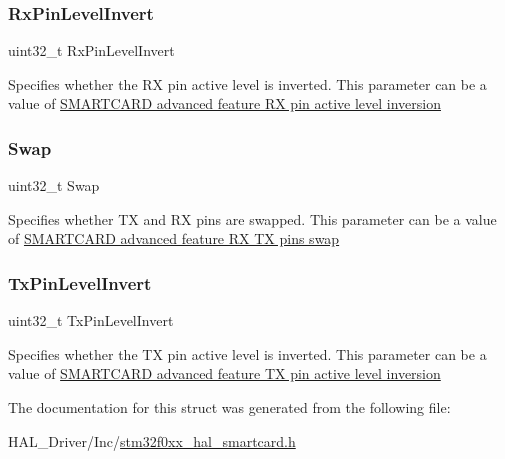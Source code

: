 \subsubsection{\texorpdfstring{Rx\+Pin\+Level\+Invert}{RxPinLevelInvert}}
{\footnotesize\ttfamily uint32\+\_\+t Rx\+Pin\+Level\+Invert}

Specifies whether the RX pin active level is inverted. This parameter can be a value of \hyperlink{group___s_m_a_r_t_c_a_r_d___rx___inv}{S\+M\+A\+R\+T\+C\+A\+RD advanced feature RX pin active level inversion} \mbox{\label{struct_s_m_a_r_t_c_a_r_d___adv_feature_init_type_def_ac584fd738a8eca4af2f92cd10d593ab0}} 
\subsubsection{\texorpdfstring{Swap}{Swap}}
{\footnotesize\ttfamily uint32\+\_\+t Swap}

Specifies whether TX and RX pins are swapped. This parameter can be a value of \hyperlink{group___s_m_a_r_t_c_a_r_d___rx___tx___swap}{S\+M\+A\+R\+T\+C\+A\+RD advanced feature RX TX pins swap} \mbox{\label{struct_s_m_a_r_t_c_a_r_d___adv_feature_init_type_def_a60e165495975a7d568a8ffad4e8d8d82}} 
\subsubsection{\texorpdfstring{Tx\+Pin\+Level\+Invert}{TxPinLevelInvert}}
{\footnotesize\ttfamily uint32\+\_\+t Tx\+Pin\+Level\+Invert}

Specifies whether the TX pin active level is inverted. This parameter can be a value of \hyperlink{group___s_m_a_r_t_c_a_r_d___tx___inv}{S\+M\+A\+R\+T\+C\+A\+RD advanced feature TX pin active level inversion} 

The documentation for this struct was generated from the following file\+:\begin{DoxyCompactItemize}
\item 
H\+A\+L\+\_\+\+Driver/\+Inc/\hyperlink{stm32f0xx__hal__smartcard_8h}{stm32f0xx\+\_\+hal\+\_\+smartcard.\+h}\end{DoxyCompactItemize}
